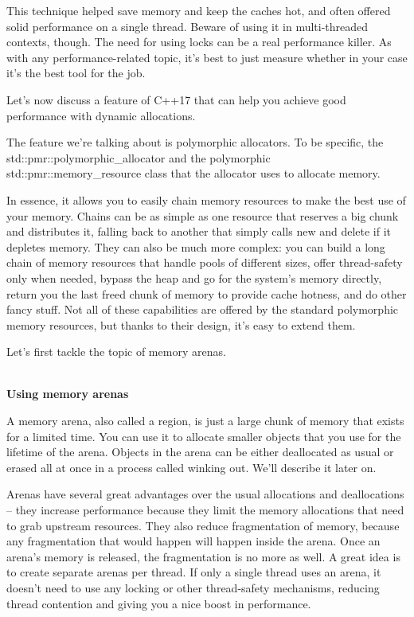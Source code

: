 This technique helped save memory and keep the caches hot, and often offered solid performance on a single thread. Beware of using it in multi-threaded contexts, though. The need for using locks can be a real performance killer. As with any performance-related topic, it's best to just measure whether in your case it's the best tool for the job.

Let's now discuss a feature of C++17 that can help you achieve good performance with dynamic allocations.


The feature we're talking about is polymorphic allocators. To be specific, the std::pmr::polymorphic\_allocator and the polymorphic std::pmr::memory\_resource class that the allocator uses to allocate memory.

In essence, it allows you to easily chain memory resources to make the best use of your memory. Chains can be as simple as one resource that reserves a big chunk and distributes it, falling back to another that simply calls new and delete if it depletes memory. They can also be much more complex: you can build a long chain of memory resources that handle pools of different sizes, offer thread-safety only when needed, bypass the heap and go for the system's memory directly, return you the last freed chunk of memory to provide cache hotness, and do other fancy stuff. Not all of these capabilities are offered by the standard polymorphic memory resources, but thanks to their design, it's easy to extend them.

Let's first tackle the topic of memory arenas.

\hspace*{\fill} \\ %
\noindent
\textbf{Using memory arenas}

A memory arena, also called a region, is just a large chunk of memory that exists for a limited time. You can use it to allocate smaller objects that you use for the lifetime of the arena. Objects in the arena can be either deallocated as usual or erased all at once in a process called winking out. We'll describe it later on.

Arenas have several great advantages over the usual allocations and deallocations – they increase performance because they limit the memory allocations that need to grab upstream resources. They also reduce fragmentation of memory, because any fragmentation that would happen will happen inside the arena. Once an arena's memory is released, the fragmentation is no more as well. A great idea is to create separate arenas per thread. If only a single thread uses an arena, it doesn't need to use any locking or other thread-safety mechanisms, reducing thread contention and giving you a nice boost in performance.


